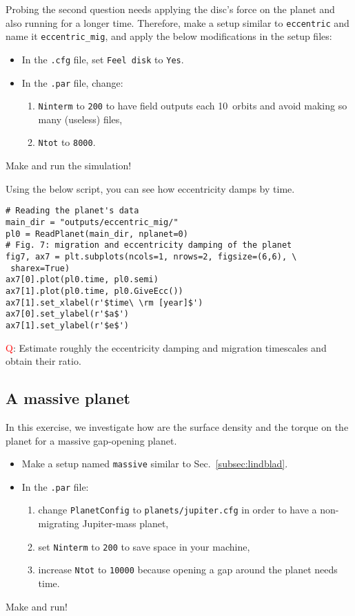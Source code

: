\documentclass[14pt]{scrartcl}
\begin{document}
Probing the second question needs applying the disc's force on the planet and also running for a longer time. Therefore, make a setup similar to \texttt{eccentric} and name it \texttt{eccentric\_mig}, and apply the below modifications in the setup files:
\begin{itemize}
	\item In the \texttt{.cfg} file, set \texttt{Feel disk} to \texttt{Yes}.
	\item In the \texttt{.par} file, change:
	\begin{enumerate}
		\item \texttt{Ninterm} to \texttt{200} to have field outputs each 10~orbits and avoid making so many (useless) files,
		\item \texttt{Ntot} to \texttt{8000}.
	\end{enumerate}
\end{itemize}
Make and run the simulation!

Using the below script, you can see how eccentricity damps by time.
\begin{verbatim}
# Reading the planet's data
main_dir = "outputs/eccentric_mig/"
pl0 = ReadPlanet(main_dir, nplanet=0)
# Fig. 7: migration and eccentricity damping of the planet
fig7, ax7 = plt.subplots(ncols=1, nrows=2, figsize=(6,6), \
 sharex=True)
ax7[0].plot(pl0.time, pl0.semi)
ax7[1].plot(pl0.time, pl0.GiveEcc())
ax7[1].set_xlabel(r'$time\ \rm [year]$')
ax7[0].set_ylabel(r'$a$')
ax7[1].set_ylabel(r'$e$')
\end{verbatim}

\textcolor{red}{Q}: Estimate roughly the eccentricity damping and migration timescales and obtain their ratio.

\subsection{A massive planet} \label{subsec:gap}
In this exercise, we investigate how are the surface density and the torque on the planet for a massive gap-opening planet.  
\begin{itemize}
	\item Make a setup named \texttt{massive} similar to Sec.~\ref{subsec:lindblad}.
	\item In the \texttt{.par} file:
	\begin{enumerate}
		\item change \texttt{PlanetConfig} to \texttt{planets/jupiter.cfg} in order to have a non-migrating Jupiter-mass planet,
		\item set \texttt{Ninterm} to \texttt{200} to save space in your machine,
		\item increase \texttt{Ntot} to \texttt{10000} because opening a gap around the planet needs time.
	\end{enumerate}
\end{itemize}
Make and run!
\end{document}
